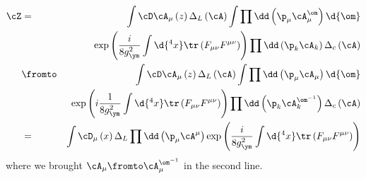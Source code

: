 \documentclass{booc}
\begin{document}
\begin{eqnarray}
\cZ &=&  \int \cD \cA_\mu\left( z \right) \Delta_L\left( \cA \right) \int \prod \dd\left( \p_\mu \cA^\om_\mu
\right)\d{\om}\\ 
&& \exp\left( 
\frac{i}{8g_{\ym}^2} \int \d{^4x} \tr\left( F_{\mu\nu}F^{\mu\nu} \right)\right)
\prod \dd\left( \p_k \cA_k \right) \Delta_c\left( \cA \right)\\
&\fromto &  \int \cD \cA_\mu\left( z \right) \Delta_L\left( \cA \right) \int \prod \dd\left( \p_\mu \cA_\mu
\right)\d{\om}\\
&&\exp\left( 
i\frac{1}{8g_{\ym}^2} \int \d{^4x} \tr\left( F_{\mu\nu}F^{\mu\nu} \right)\right)
\prod \dd\left( \p_k \cA_k^{\om^{-1}} \right) \Delta_c\left( \cA \right)\\
&=& \int \cD_\mu\left( x \right) \Delta_L
\prod \dd\left( \p_\mu \cA^\mu \right)
\exp\left( \frac{i}{8 g_\ym^2}\int \d{^4x} \tr\left( F_{\mu\nu}F^{\mu\nu} \right) \right)
\end{eqnarray}
where we brought $\cA_\mu \fromto \cA_\mu^{\om^{-1}}$
in the second line.
\end{document}
